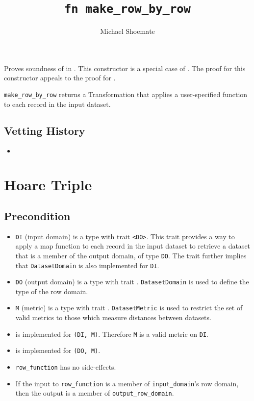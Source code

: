 \documentclass{article}
\title{\texttt{fn make\_row\_by\_row}}
\author{Michael Shoemate}
\date{}
\begin{document}
\maketitle

\contrib
Proves soundness of  in .
This constructor is a special case of .
The proof for this constructor appeals to the proof for .

\texttt{make\_row\_by\_row} returns a Transformation that applies a user-specified function to each record in the input dataset.

\subsection*{Vetting History}
\begin{itemize}
    \item {}
\end{itemize}

\section{Hoare Triple}
\subsection*{Precondition}
\begin{itemize}

    \item \texttt{DI} (input domain) is a type with trait \texttt{<DO>}. 
        This trait provides a way to apply a map function to each record in the input dataset to retrieve a dataset that is a member of the output domain, of type \texttt{DO}. The trait further implies that \texttt{DatasetDomain} is also implemented for \texttt{DI}.
    \item \texttt{DO} (output domain) is a type with trait . 
        \texttt{DatasetDomain} is used to define the type of the row domain.
    \item \texttt{M} (metric) is a type with trait . 
        \texttt{DatasetMetric} is used to restrict the set of valid metrics to those which measure distances between datasets.
    \item {} is implemented for \texttt{(DI, M)}. Therefore \texttt{M} is a valid metric on \texttt{DI}.
    \item {} is implemented for \texttt{(DO, M)}.
    \item \texttt{row\_function} has no side-effects.
    \item If the input to \texttt{row\_function} is a member of \texttt{input\_domain}'s row domain, then the output is a member of \texttt{output\_row\_domain}.
\end{itemize}
\end{document}
